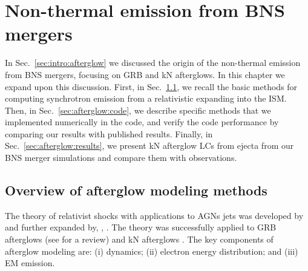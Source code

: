 
\chapter{Non-thermal emission from \ac{BNS} mergers} \label{ch:afterglow} 


In Sec.~\ref{sec:intro:afterglow} we discussed the origin of 
the non-thermal emission from \ac{BNS} mergers, focusing on 
\ac{GRB} and \ac{kN} afterglows. 
%
In this chapter we expand upon this discussion. First, in 
Sec.~\ref{sec:intro:afterglow_modelling}, we recall the basic methods 
for computing synchrotron emission from a relativistic \blast{} 
expanding into the \ac{ISM}. 
%
Then, in Sec.~\ref{sec:afterglow:code}, we describe specific methods 
that we implemented numerically in the \pyblast{} code, and verify the 
code performance by comparing our results with published results. 
%
Finally, in Sec.~\ref{sec:afterglow:results}, we present 
\ac{kN} afterglow \acp{LC} from ejecta from our \ac{BNS} merger 
simulations and compare them with observations. 



\section{Overview of afterglow modeling methods}\label{sec:intro:afterglow_modelling}

The theory of relativist shocks with applications to \acp{AGN} jets was 
developed by \citet{Blandford:1976} 
and further expanded by, \eg, \citet{vanEerten:2011bf,Nava:2013,Peer:2012}. 
The theory was successfully applied to \ac{GRB} afterglows 
\citep[\eg][]{Costa:1997cg,vanParadijs:1997wr,Lamb:2017ych}
(see \citet{Kumar:2014upa} for a review) 
and \ac{kN} afterglows \citep[\eg][]{Nakar:2011cw,Hotokezaka:2015eja,Hotokezaka:2018gmo}.
%
%
%
The key components of afterglow modeling are: (i) \blast{} dynamics; 
(ii) electron energy distribution; and (iii) \ac{EM} emission. 



